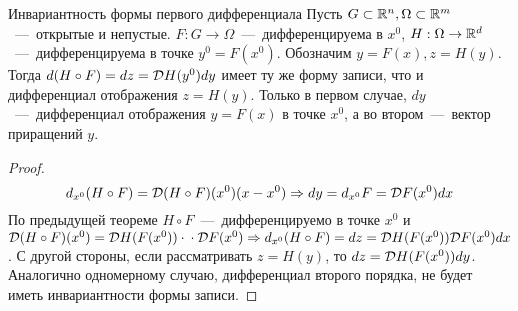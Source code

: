\begin{corollary} 
    Инвариантность формы первого дифференциала
    Пусть $G \subset \mathbb{R}^n, \Omega \subset \mathbb{R}^m$~---~открытые и непустые. $F : G \rightarrow \Omega$~---~дифференцируема в $x^0$, $H: \Omega \rightarrow \mathbb{R}^d$~---~дифференцируема в точке $y^0 = F(x^0)$. Обозначим $y = F(x), z = H(y)$. Тогда $d(H \circ F) = dz = \mathcal{D} H(y^0)dy$ имеет ту же форму записи, что и дифференциал отображения $z = H(y)$. Только в первом случае, $dy$~---~дифференциал отображения $y = F(x)$ в точке $x^0$, а во втором~---~вектор приращений $y$.
    \begin{proof}
        $$d_{x^0}(H\circ F) = \mathcal{D}(H \circ F)(x^0)(x - x^0) \Rightarrow dy = d_{x^0}F = \mathcal{D} F(x^0) dx$$
        По предыдущей теореме $H \circ F$~---~дифференцируемо в точке $x^0$ и $\mathcal{D} (H\circ F)(x^0) = \mathcal{D} H(F(x^0)) \cdot \\ \cdot \mathcal{D} F(x^0) \Rightarrow d_{x^0}(H \circ F) = dz = \mathcal{D} H(F(x^0)) \mathcal{D} F(x^0)dx$. С другой стороны, если рассматривать $z = H(y)$, то $dz = \mathcal{D} H(F(x^0)) dy$. 
        Аналогично одномерному случаю, дифференциал второго порядка, не будет иметь инвариантности формы записи. 
    \end{proof}
\end{corollary}
